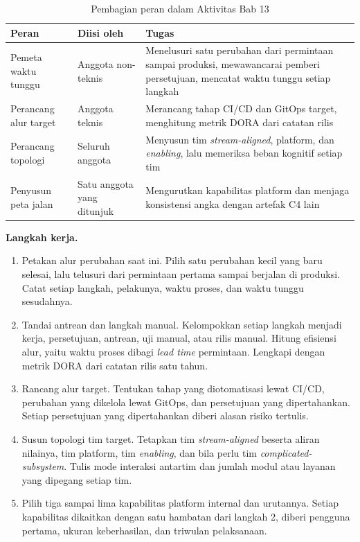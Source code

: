 \begin{table}[!htb]
  \centering
  \caption{Pembagian peran dalam Aktivitas Bab 13}
  \label{tab:ch13-peran}
  \footnotesize
  \begin{tabularx}{\textwidth}{>{\raggedright\arraybackslash}p{2.8cm} >{\raggedright\arraybackslash}p{3.0cm} >{\raggedright\arraybackslash}X}
    \hline
    \textbf{Peran} & \textbf{Diisi oleh} & \textbf{Tugas} \\ \hline
    Pemeta waktu tunggu & Anggota non-teknis & Menelusuri satu perubahan dari permintaan sampai
      produksi, mewawancarai pemberi persetujuan, mencatat waktu tunggu setiap langkah \\ \hline
    Perancang alur target & Anggota teknis & Merancang tahap CI/CD dan GitOps target, menghitung
      metrik DORA dari catatan rilis \\ \hline
    Perancang topologi & Seluruh anggota & Menyusun tim \textit{stream-aligned}, platform, dan
      \textit{enabling}, lalu memeriksa beban kognitif setiap tim \\ \hline
    Penyusun peta jalan & Satu anggota yang ditunjuk & Mengurutkan kapabilitas platform dan
      menjaga konsistensi angka dengan artefak C4 lain \\ \hline
  \end{tabularx}
\end{table}

\textbf{Langkah kerja.}
\begin{enumerate}
  \item Petakan alur perubahan saat ini. Pilih satu perubahan kecil yang baru selesai, lalu
        telusuri dari permintaan pertama sampai berjalan di produksi. Catat setiap langkah,
        pelakunya, waktu proses, dan waktu tunggu sesudahnya.
  \item Tandai antrean dan langkah manual. Kelompokkan setiap langkah menjadi kerja, persetujuan,
        antrean, uji manual, atau rilis manual. Hitung efisiensi alur, yaitu waktu proses dibagi
        \textit{lead time} permintaan. Lengkapi dengan metrik DORA dari catatan rilis satu tahun.
  \item Rancang alur target. Tentukan tahap yang diotomatisasi lewat CI/CD, perubahan yang dikelola
        lewat GitOps, dan persetujuan yang dipertahankan. Setiap persetujuan yang dipertahankan
        diberi alasan risiko tertulis.
  \item Susun topologi tim target. Tetapkan tim \textit{stream-aligned} beserta aliran nilainya,
        tim platform, tim \textit{enabling}, dan bila perlu tim \textit{complicated-subsystem}.
        Tulis mode interaksi antartim dan jumlah modul atau layanan yang dipegang setiap tim.
  \item Pilih tiga sampai lima kapabilitas platform internal dan urutannya. Setiap kapabilitas
        dikaitkan dengan satu hambatan dari langkah 2, diberi pengguna pertama, ukuran
        keberhasilan, dan triwulan pelaksanaan.
\end{enumerate}

